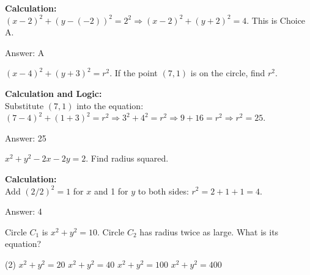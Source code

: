 \documentclass[11pt,paper=a4,answers]{exam}
\begin{document}
\begin{questions}
\begin{solution}
\textbf{Calculation:} \\
$(x - 2)^2 + (y - (-2))^2 = 2^2 \Rightarrow (x - 2)^2 + (y + 2)^2 = 4$. This is Choice A.

\vspace{30pt}

Answer: \colorbox{yellow!100}{A}
\end{solution}

\vspace{60pt}

\question
$(x-4)^2 + (y+3)^2 = r^2$. If the point $(7, 1)$ is on the circle, find $r^2$.

\begin{solution}
\textbf{Calculation and Logic:} \\
Substitute $(7, 1)$ into the equation: $(7-4)^2 + (1+3)^2 = r^2 \Rightarrow 3^2 + 4^2 = r^2 \Rightarrow 9 + 16 = r^2 \Rightarrow r^2 = 25$.

\vspace{30pt}

Answer: \colorbox{yellow!100}{25}
\end{solution}

\vspace{60pt}

\question
$x^2 + y^2 - 2x - 2y = 2$. Find radius squared.

\begin{solution}
\textbf{Calculation:} \\
Add $(2/2)^2=1$ for $x$ and 1 for $y$ to both sides: $r^2 = 2 + 1 + 1 = 4$.

\vspace{30pt}

Answer: \colorbox{yellow!100}{4}
\end{solution}

\vspace{60pt}

\question
Circle $C_1$ is $x^2 + y^2 = 10$. Circle $C_2$ has radius twice as large. What is its equation?
\begin{tasks}(2)
    \task $x^2 + y^2 = 20$
    \task $x^2 + y^2 = 40$
    \task $x^2 + y^2 = 100$
    \task $x^2 + y^2 = 400$
\end{tasks}


\end{questions}
\end{document}
